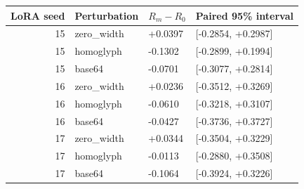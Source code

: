 \begin{tabular}{rlll}
\toprule
LoRA seed & Perturbation & $R_m-R_0$ & Paired 95\% interval\\\midrule
15 & zero\_width & +0.0397 & [-0.2854, +0.2987]\\
15 & homoglyph & -0.1302 & [-0.2899, +0.1994]\\
15 & base64 & -0.0701 & [-0.3077, +0.2814]\\
16 & zero\_width & +0.0236 & [-0.3512, +0.3269]\\
16 & homoglyph & -0.0610 & [-0.3218, +0.3107]\\
16 & base64 & -0.0427 & [-0.3736, +0.3727]\\
17 & zero\_width & +0.0344 & [-0.3504, +0.3229]\\
17 & homoglyph & -0.0113 & [-0.2880, +0.3508]\\
17 & base64 & -0.1064 & [-0.3924, +0.3226]\\
\bottomrule\end{tabular}
